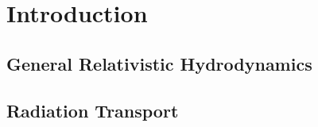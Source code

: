 \chapter{Introduction}
\label{chap:intro}



\section{General Relativistic Hydrodynamics}
\label{sec:gr_hydro}

\section{Radiation Transport}
\label{sec:rad_transport}

